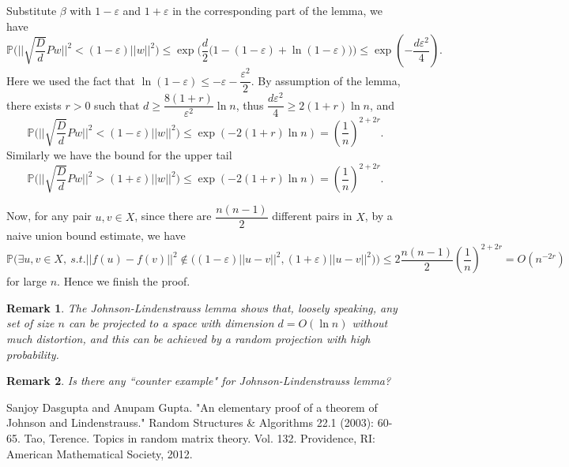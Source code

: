 \documentclass[12pt]{article}
\theoremstyle{plain}
\newtheorem*{remark}{Remark}
\begin{document}
Substitute $\beta$ with $1-\varepsilon$ and $1+\varepsilon$ in the corresponding part of the lemma, we have $$\mathbb{P}\Big(||\sqrt{\dfrac{D}{d}}Pw||^2 <(1-\varepsilon)||w||^2\Big) \le \exp\Big(\dfrac{d}{2}\big(1-(1-\varepsilon)+\ln(1-\varepsilon)\big)\Big)\le \exp(-\dfrac{d\varepsilon^2}{4}).$$ Here we used the fact that $\ln(1-\varepsilon)\le -\varepsilon-\dfrac{\varepsilon^2}{2}$. By assumption of the lemma, there exists $r>0$ such that $d\ge \dfrac{8(1+r)}{\varepsilon^2}\ln n$, thus $\dfrac{d\varepsilon^2}{4}\ge 2(1+r)\ln n$, and $$\mathbb{P}\Big(||\sqrt{\dfrac{D}{d}}Pw||^2 <(1-\varepsilon)||w||^2\Big) \le \exp(-2(1+r)\ln n)=(\dfrac{1}{n})^{2+2r}.$$ Similarly we have the bound for the upper tail $$\mathbb{P}\Big(||\sqrt{\dfrac{D}{d}}Pw||^2 >(1+\varepsilon)||w||^2\Big) \le \exp(-2(1+r)\ln n)=(\dfrac{1}{n})^{2+2r}.$$

Now, for any pair $u,v\in X$, since there are $\dfrac{n(n-1)}{2}$ different pairs in $X$, by a naive union bound estimate, we have $$\mathbb{P}\Big(\exists u,v\in X,~s.t.||f(u)-f(v)||^2 \notin \big((1-\varepsilon)||u-v||^2,(1+\varepsilon)||u-v||^2  \big) \Big)\le 2\dfrac{n(n-1)}{2}(\dfrac{1}{n})^{2+2r}=O(n^{-2r})$$ for large $n$. Hence we finish the proof.

\begin{remark}
	The Johnson-Lindenstrauss lemma shows that, loosely speaking, any set of size $n$ can be projected to a space with dimension $d =O( \ln n)$ without much distortion, and this can be achieved by a random projection with high probability.
\end{remark}

\begin{remark}
	Is there any ``counter example" for Johnson-Lindenstrauss lemma? 
\end{remark}


\begin{thebibliography}{[AHU]}
	 Sanjoy Dasgupta and Anupam Gupta. "An elementary proof of a theorem of Johnson and Lindenstrauss." Random Structures \& Algorithms 22.1 (2003): 60-65.
	 Tao, Terence. Topics in random matrix theory. Vol. 132. Providence, RI: American Mathematical Society, 2012.
\end{thebibliography}
\end{document}
